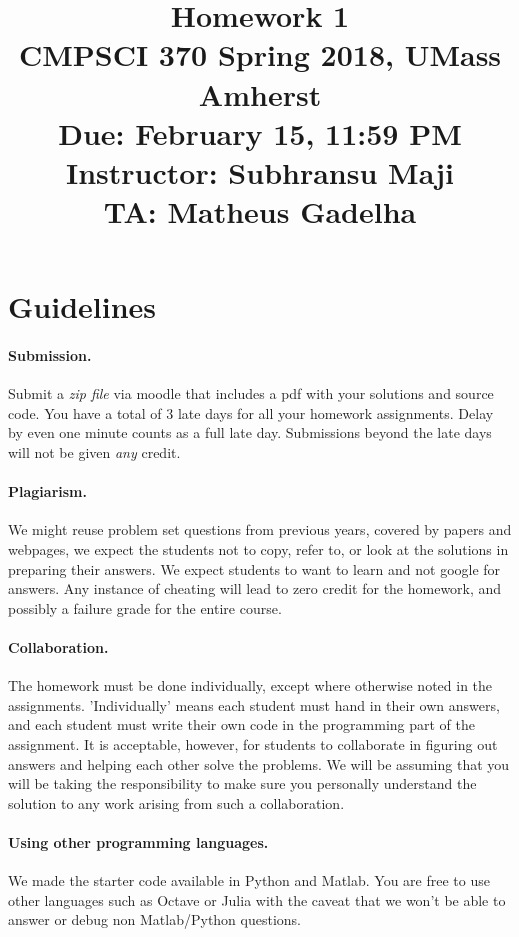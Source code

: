 \documentclass[10pt,letterpaper]{article}
\title{
  Homework 1 \\
  \Large{CMPSCI 370 Spring 2018, UMass Amherst} \\
  \Large{Due: February 15, 11:59 PM} \\
  \Large{Instructor: Subhransu Maji} \\
  \Large{TA: Matheus Gadelha}
}
\date{}
\begin{document}
\maketitle

\renewcommand\thesubsection{\thesection.\alph{subsection}}


\section*{Guidelines}

\paragraph{Submission.} Submit a \emph{zip file} via moodle that includes a pdf with your solutions and source code. You have a total of 3 late days for all your homework assignments. Delay by even one minute counts as a full late day. Submissions beyond the late days will not be given \emph{any} credit.

\paragraph{Plagiarism.} We might reuse problem set questions from previous years, covered by papers and webpages, we expect the students not to copy, refer to, or look at the solutions in preparing their answers. We expect students to want to learn and not google for answers. Any instance of cheating will lead to zero credit for the homework, and possibly a failure grade for the entire course.

\paragraph{Collaboration.} The homework must be done individually, except where otherwise noted in the assignments. 'Individually' means each student must hand in their own answers, and each student must write their own code in the programming part of the assignment. It is acceptable, however, for students to collaborate in figuring out answers and helping each other solve the problems. We will be assuming that you will be taking the responsibility to make sure you personally understand the solution to any work arising from such a collaboration.

\paragraph{Using other programming languages.} We made the starter code available in Python and Matlab. You are free to use other languages such as Octave or Julia with the caveat that we won't be able to answer or debug non Matlab/Python questions.
\end{document}
